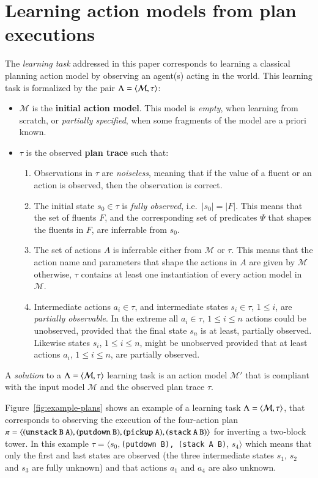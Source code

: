 \section{Learning action models from plan executions}
\label{sec:learning}
The {\em learning task} addressed in this paper corresponds to learning a classical planning action model by observing an agent(s) acting in the world. This learning task is formalized by the pair $\Lambda={\langle \mathcal{M},\tau \rangle}$:
\begin{itemize}
\item $\mathcal{M}$ is the {\bf initial action model}. This model is {\em empty}, when learning from scratch, or {\em partially specified}, when some fragments of the model are a priori known.
\item $\tau$ is the observed {\bf plan trace} such that:
\begin{enumerate}
 \item Observations in $\tau$ are {\em noiseless}, meaning that if the value of a fluent or an action is observed, then the observation is correct. 
\item The initial state $s_0\in\tau$ is {\em fully observed}, i.e.~$|s_0|=|F|$. This means that the set of fluents $F$, and the corresponding set of predicates $\Psi$ that shapes the fluents in $F$, are inferrable from $s_0$.
\item The set of actions $A$ is inferrable either from $\mathcal{M}$ or $\tau$. This means that the action name and parameters that shape the actions in $A$ are given by $\mathcal{M}$ otherwise, $\tau$ contains at least one instantiation of every action model in $\mathcal{M}$.
\item Intermediate actions $a_i\in\tau$, and intermediate states $s_i\in\tau$, {\small $1\leq i$}, are {\em partially observable}. In the extreme all $a_i\in\tau$, {\small $1\leq i\leq n$} actions could be unobserved, provided that the final state $s_n$ is at least, partially observed. Likewise states $s_i$, {\small $1\leq i\leq n$}, might be unobserved provided that at least actions $a_i$, {\small $1\leq i\leq n$}, are partially observed. 

\end{enumerate}
\end{itemize}

A {\em solution} to a $\Lambda={\langle \mathcal{M},\tau \rangle}$ learning task is an action model $\mathcal{M}'$ that is compliant with the input model $\mathcal{M}$ and the observed plan trace $\tau$. 

Figure~\ref{fig:example-plans} shows an example of a learning task $\Lambda={\langle \mathcal{M},\tau \rangle}$, that corresponds to observing the execution of the four-action plan $\pi={\langle \small\tt (unstack\ B\ A), (putdown\ B), (pickup\ A), (stack\ A\ B) \rangle}$ for inverting a two-block tower. In this example $\tau=\langle s_0,${\small\tt (putdown\ B), (stack\ A\ B)}, $s_4\rangle$ which means that only the first and last states are observed (the three intermediate states $s_1$, $s_2$ and $s_3$ are fully unknown) and that actions $a_1$ and $a_4$ are also unknown. 

